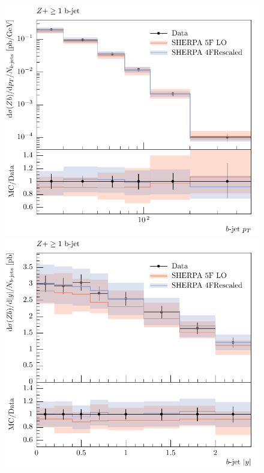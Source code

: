 \documentclass[11pt]{cernrep}
\begin{document}
\begin{figure}[htbp]
\begin{center}
   \includegraphics[scale=0.65]{figs/zbb/sherpa/d03-x01-y01_rescaled.pdf}
   \includegraphics[scale=0.65]{figs/zbb/sherpa/d05-x01-y01_rescaled.pdf} \\

\end{center}
\end{figure}
\end{document}
